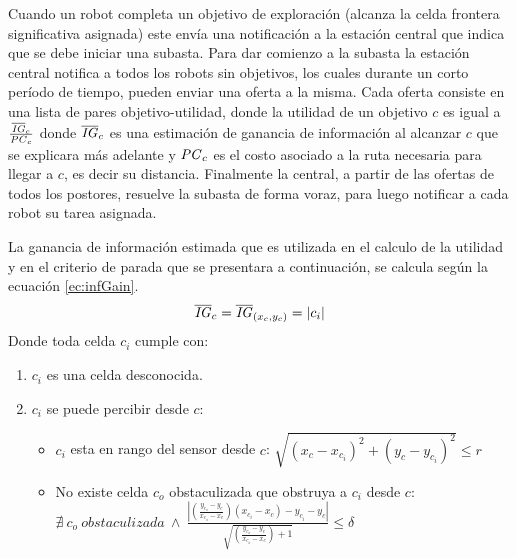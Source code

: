 Cuando un robot completa un objetivo de exploración (alcanza la celda frontera significativa asignada) este envía una notificación a la estación central que indica que se debe iniciar una subasta. Para dar comienzo a la subasta la estación central notifica a todos los robots sin objetivos, los cuales durante un corto período de tiempo, pueden enviar una oferta a la misma. Cada oferta consiste en una lista de pares objetivo-utilidad, donde la utilidad de un objetivo $c$ es igual a $\frac{\overline{\mathit{IG}}_c}{\mathit{PC}_c}$ donde $\overline{\mathit{IG}}_c$ es una estimación de ganancia de información al alcanzar $c$ que se explicara más adelante y $\mathit{PC}_c$ es el costo asociado a la ruta necesaria para llegar a $c$, es decir su distancia. Finalmente la central, a partir de las ofertas de todos los postores, resuelve la subasta de forma voraz, para luego notificar a cada robot su tarea asignada.


La ganancia de información estimada que es utilizada en el calculo de la utilidad y en el criterio de parada que se presentara a continuación, se calcula según la ecuación \ref{ec:infGain}. 
\begin{equation}\label{ec:infGain}
  \overline{\mathit{IG}}_c = \overline{\mathit{IG}}_{(x_c,y_c)} = |{c_i}|
\end{equation}
Donde toda celda $c_i$ cumple con:
\begin{enumerate}[label=(\roman*)]
  \item $c_i$ es una celda desconocida.
  \item $c_i$ se puede percibir desde $c$:
  \begin{itemize}
    \item $c_i$ esta en rango del sensor desde $c$: $\sqrt{(x_c - x_{c_i})^2 + (y_c - y_{c_i})^2}\leq r$
    \item No existe celda $c_o$ obstaculizada que obstruya a $c_i$ desde $c$:\\
      $\nexists\ c_o \ obstaculizada \ \land \ \frac{ |(\frac{y_{c_o}-y_c}{x_{c_o}-x_c})(x_{c_i}-x_c) - y_{c_i} - y_{c}| }{\sqrt{(\frac{y_{c_o}-y_c}{x_{c_o}-x_c})+1}}\leq \delta $
  \end{itemize}
\end{enumerate}

